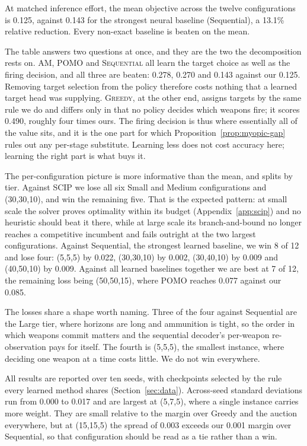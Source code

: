 At matched inference effort, the mean objective across the twelve
configurations is 0.125, against 0.143 for the strongest neural baseline
(Sequential), a 13.1\% relative reduction. Every non-exact baseline is beaten
on the mean.

The table answers two questions at once, and they are the two the
decomposition rests on. \textsc{AM}, \textsc{POMO} and \textsc{Sequential}
all learn the target choice as well as the firing decision, and all three are
beaten: 0.278, 0.270 and 0.143 against our 0.125. Removing target selection
from the policy therefore costs nothing that a learned target head was
supplying. \textsc{Greedy}, at the other end, assigns targets by the same rule
we do and differs only in that no policy decides which weapons fire; it scores
0.490, roughly four times ours. The firing decision is thus where essentially
all of the value sits,
and it is the one part for which Proposition~\ref{prop:myopic-gap} rules out
any per-stage substitute. Learning less does not cost accuracy here; learning
the right part is what buys it.

The per-configuration picture is more informative than the mean, and splits
by tier. Against SCIP we lose all six Small and Medium configurations and
(30,30,10), and win the remaining five. That is the expected pattern: at small
scale the solver proves optimality within its budget
(Appendix~\ref{app:scip}) and no heuristic should beat it there, while at
large scale its branch-and-bound no longer reaches a competitive incumbent and
fails outright at the two largest configurations. Against Sequential, the
strongest learned baseline, we win 8 of 12 and lose four: (5,5,5) by 0.022,
(30,30,10) by 0.002, (30,40,10) by 0.009 and (40,50,10) by 0.009. Against all
learned baselines together we are best at 7 of 12, the remaining loss being
(50,50,15), where POMO reaches 0.077 against our 0.085.

The losses share a shape worth naming. Three of the four against Sequential
are the Large tier, where horizons are long and ammunition is tight, so the
order in which weapons commit matters and the sequential decoder's per-weapon
re-observation pays for itself. The fourth is (5,5,5), the smallest instance,
where deciding one weapon at a time costs little. We do not win everywhere.

All results are reported over ten seeds, with checkpoints selected by the
rule every learned method shares (Section~\ref{sec:data}). Across-seed
standard deviations run from 0.000 to 0.017 and are largest at (5,7,5), where a
single instance carries more weight. They are small relative to the margin
over Greedy and the auction everywhere, but at (15,15,5) the spread of 0.003
exceeds our 0.001 margin over Sequential, so that configuration should be read
as a tie rather than a win.

